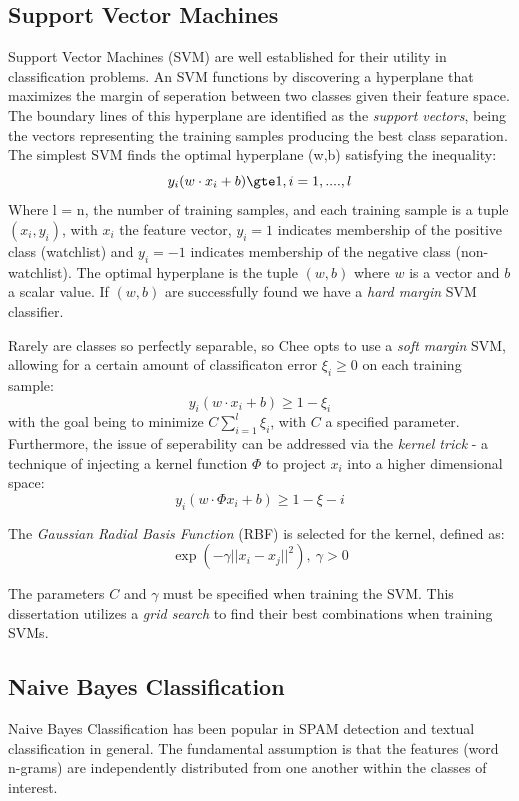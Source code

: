 \documentclass[twoside,11pt]{article}
\begin{document}
\subsection{Support Vector Machines}
Support Vector Machines (SVM) \citep{Cortes, Vapnik} are well established for their utility in classification problems. An SVM functions by discovering a hyperplane that maximizes the margin of seperation between two classes given their feature space. The boundary lines of this hyperplane are identified as the \textit{support vectors}, being the vectors representing the training samples producing the best class separation. The simplest SVM finds the optimal hyperplane (w,b) satisfying the inequality:
\[
  y_{i}(w \cdot x_{i} + b) \gte 1,  i = 1, ...., l
\]
Where l = n, the number of training samples, and each training sample is a tuple $(x_{i}, y_{i})$, with $x_{i}$ the feature vector, $y_{i} = 1$ indicates membership of the positive class (watchlist) and $y_{i} = -1$ indicates membership of the negative class (non-watchlist). The optimal hyperplane is the tuple $(w, b)$ where $w$ is a vector and $b$ a scalar value. If $(w, b)$ are successfully found we have a \textit{hard margin} SVM classifier.

Rarely are classes so perfectly separable, so Chee opts to use a \textit{soft margin} SVM, allowing for a certain amount of classificaton error $\xi_{i} \geq 0$ on each training sample:
\[
  y_{i}(w \cdot x_{i} + b) \geq 1 - \xi_{i}
\]
with the goal being to minimize $C\sum_{i=1}^{l} \xi_{i}$, with $C$ a specified parameter. Furthermore, the issue of seperability can be addressed via the \textit{kernel trick} - a technique of injecting a kernel function $\Phi$ to project $x_{i}$ into a higher dimensional space:
\[
  y_{i}(w \cdot \Phi{x_{i}} + b) \geq 1 - \xi-{i}
\]

The \textit{Gaussian Radial Basis Function} (RBF) is selected for the kernel, defined as:
\[
  \exp(-\gamma||x_{i} - x_{j}||^{2}),\ \gamma > 0
\]

The parameters $C$ and $\gamma$ must be specified when training the SVM. This dissertation utilizes a \textit{grid search} to find their best combinations when training SVMs.


\subsection{Naive Bayes Classification}
Naive Bayes Classification has been popular in SPAM detection \citep{Sahami, 1998} and textual classification in general. The fundamental assumption is that the features (word n-grams) are independently distributed from one another within the classes of interest.
\end{document}
